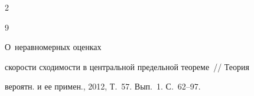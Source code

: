 \begin{multicols}{2}
{{\begin{thebibliography}{9}
\label{end\stat}




 О~неравномерных оценках

скорости сходимости в центральной предельной теореме~// Теория

вероятн. и ее примен., 2012, Т.~57. Вып.~1. С.~62--97.

\end{thebibliography}

}

}



\end{multicols}

